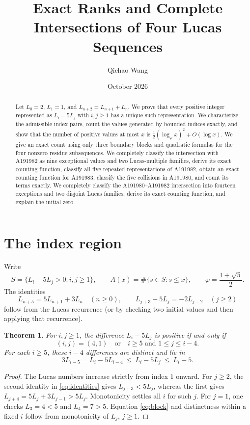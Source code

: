 \documentclass[11pt]{article}
\title{Exact Ranks and Complete Intersections of Four Lucas Sequences}
\author{Qichao Wang}
\date{October 2026}
\newtheorem{theorem}{Theorem}
\begin{document}
\maketitle
\begin{abstract}
Let $L_0=2$, $L_1=1$, and $L_{n+2}=L_{n+1}+L_n$. We prove that every positive integer represented as $L_i-5L_j$ with $i,j\geq1$ has a unique such representation. We characterize the admissible index pairs, count the values generated by bounded indices exactly, and show that the number of positive values at most $x$ is $\frac12(\log_\varphi x)^2+O(\log x)$. We give an exact count using only three boundary blocks and quadratic formulas for the four nonzero residue subsequences. We completely classify the intersection with A191982 as nine exceptional values and two Lucas-multiple families, derive its exact counting function, classify all five repeated representations of A191982, obtain an exact counting function for A191983, classify the five collisions in A191980, and count its terms exactly. We completely classify the A191980--A191982 intersection into fourteen exceptions and two disjoint Lucas families, derive its exact counting function, and explain the initial zero.
\end{abstract}

\section*{The index region}
Write
\[
 S=\{L_i-5L_j>0:i,j\ge1\},\qquad
 A(x)=\#\{s\in S:s\le x\},\qquad
 \varphi=\frac{1+\sqrt5}{2}.
\]
The identities
\begin{equation}\label{eq:identities}
 L_{n+5}=5L_{n+1}+3L_n\quad(n\ge0),\qquad
 L_{j+3}-5L_j=-2L_{j-2}\quad(j\ge2)
\end{equation}
follow from the Lucas recurrence (or by checking two initial values and then applying that recurrence).

\begin{theorem}\label{thm:region}
For $i,j\ge1$, the difference $L_i-5L_j$ is positive if and only if
\[
 (i,j)=(4,1)\quad\text{or}\quad i\ge5\text{ and }1\le j\le i-4.
\]
For each $i\ge5$, these $i-4$ differences are distinct and lie in
\begin{equation}\label{eq:block}
 3L_{i-5}=L_i-5L_{i-4}\ \le\ L_i-5L_j\ \le\ L_i-5.
\end{equation}
\end{theorem}
\begin{proof}
The Lucas numbers increase strictly from index $1$ onward. For $j\ge2$, the second identity in \eqref{eq:identities} gives $L_{j+3}<5L_j$, whereas the first gives $L_{j+4}=5L_j+3L_{j-1}>5L_j$. Monotonicity settles all $i$ for such $j$. For $j=1$, one checks $L_3=4<5$ and $L_4=7>5$. Equation \eqref{eq:block} and distinctness within a fixed $i$ follow from monotonicity of $L_j$, $j\ge1$.
\end{proof}
\end{document}
